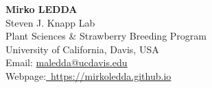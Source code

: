 \documentclass{CV}
\newcommand{\mail}[1]{\href{mailto:#1}{#1}}
\begin{document}
\begin{center}
	{\textbf{\LARGE Mirko LEDDA}}\\
	Steven J. Knapp Lab\\
	Plant Sciences \& Strawberry Breeding Program\\
	University of California, Davis, USA\\
	Email: \mail{maledda@ucdavis.edu}\\
	Webpage:\href{https://mirkoledda.github.io}{~https://mirkoledda.github.io}\\
\end{center}
~







\vspace{-1.5em}
\end{document}
